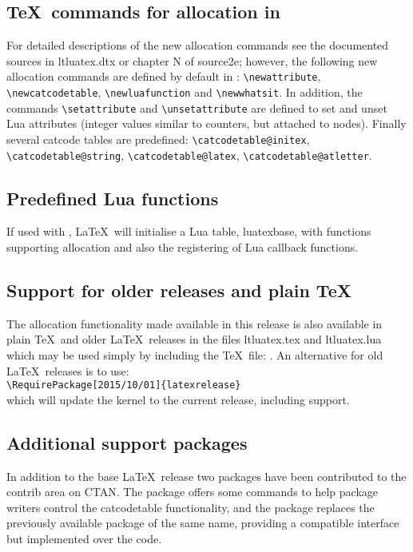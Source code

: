 \documentclass{ltnews}
\begin{document}
\subsection{\TeX\ commands for allocation in }
For detailed descriptions of the new allocation commands see the
documented sources in \textsf{ltluatex.dtx} or chapter N of
\textsf{source2e}; however, the following new allocation commands are
defined by default in :
\verb|\newattribute|,
\verb|\newcatcodetable|,
\verb|\newluafunction| and
\verb|\newwhatsit|.
In addition, the commands \verb|\setattribute| and
\verb|\unsetattribute| are defined to set and unset Lua attributes
(integer values similar to counters, but attached to nodes). Finally
several catcode tables are predefined:
\verb|\catcodetable@initex|,
\verb|\catcodetable@string|,
\verb|\catcodetable@latex|,
\verb|\catcodetable@atletter|.

\subsection{Predefined Lua functions}
If used with , \LaTeX\ will initialise a Lua table,
\textsf{luatexbase}, with functions supporting allocation and also
the registering of Lua callback functions.

\subsection{Support for older releases and plain \TeX}
The  allocation functionality made available in this
release is also available in plain \TeX\ and older \LaTeX\ releases
in the files \textsf{ltluatex.tex} and \textsf{ltluatex.lua} which may be
used simply by including the \TeX\ file: \verb||.
An alternative for old \LaTeX\ releases is to use:\\
\verb|\RequirePackage[2015/10/01]{latexrelease}|\\
which will update the kernel to the current release, including
 support.

\subsection{Additional  support packages}
In addition to the base \LaTeX\ release two packages have been
contributed to the \textsf{contrib} area on CTAN. The
 package offers some commands to help package
writers control the  \textsf{catcodetable}
functionality, and the  package replaces the
previously available package of the same name, providing a compatible
interface but implemented over the  code.
\end{document}
